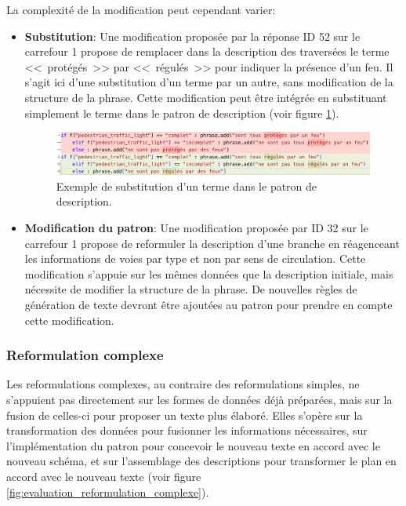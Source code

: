 \begin{samepage}
La complexité de la modification peut cependant varier:
\begin{itemize}
    \item \textbf{Substitution}: Une modification proposée par la réponse ID 52 sur le carrefour 1 propose de remplacer dans la description des traversées le terme <<~protégés~>> par <<~régulés~>> pour indiquer la présence d'un feu. Il s'agit ici d'une substitution d'un terme par un autre, sans modification de la structure de la phrase. Cette modification peut être intégrée en substituant simplement le terme dans le patron de description (voir figure \ref{fig:evaluation_reformulation_simple_substitution}).
    \begin{figure}[ht]
        \centering
        \includegraphics[width=\textwidth]{images/evaluation/pipeline/substitution.png}
        \caption[Exemple de substitution]{Exemple de substitution d'un terme dans le patron de description.}
        \label{fig:evaluation_reformulation_simple_substitution}
    \end{figure}
    \item \textbf{Modification du patron}: Une modification proposée par ID 32 sur le carrefour 1 propose de reformuler la description d'une branche en réagenceant les informations de voies par type et non par sens de circulation. Cette modification s'appuie sur les mêmes données que la description initiale, mais nécessite de modifier la structure de la phrase. De nouvelles règles de génération de texte devront être ajoutées au patron pour prendre en compte cette modification.
\end{itemize}
\end{samepage}

\subsubsection{Reformulation complexe}

Les reformulations complexes, au contraire des reformulations simples, ne s'appuient pas directement sur les formes de données déjà préparées, mais sur la fusion de celles-ci pour proposer un texte plus élaboré. Elles s'opère sur la transformation des données pour fusionner les informations nécessaires, sur l'implémentation du patron pour concevoir le nouveau texte en accord avec le nouveau schéma, et sur l'assemblage des descriptions pour transformer le plan en accord avec le nouveau texte (voir figure \ref{fig:evaluation_reformulation_complexe}).

